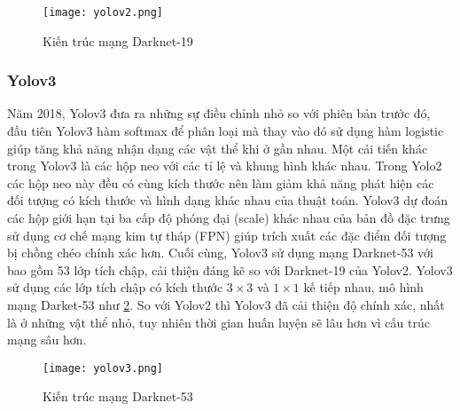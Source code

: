 \documentclass[../the.tex]{subfiles}
\begin{document}
\begin{figure}[H]
	\centering
	\texttt{[image: yolov2.png]}
	\caption{Kiến trúc mạng Darknet-19 \cite{deterseong}}
	\label{fig:yolov2}
\end{figure}
\bigskip

\subsubsection{Yolov3}
{\fontsize{13}{12} \selectfont  
Năm 2018, Yolov3 \cite{redmon2018yolov3} đưa ra những sự điều chỉnh nhỏ so với phiên bản trước đó, đầu tiên Yolov3 hàm softmax để phân loại mà thay vào đó sử dụng
hàm logistic giúp tăng khả năng nhận dạng các vật thể khi ở gần nhau. Một cải tiến khác trong Yolov3 là các hộp neo với các tỉ lệ và khung hình khác nhau. Trong Yolo2 các hộp neo này đều có cùng kích thước 
nên làm giảm khả năng phát hiện các đối tượng có kích thước và hình dạng khác nhau của thuật toán. Yolov3 dự đoán các hộp giới hạn tại ba cấp độ phóng đại (scale) khác nhau của bản đồ đặc trưng sử dụng cơ chế mạng kim tự tháp (FPN)  \cite{lin2017feature}
giúp trích xuất các đặc điểm đối tượng bị chồng chéo chính xác hơn. Cuối cùng, Yolov3 sử dụng mạng Darknet-53 với bao gồm 53 lớp tích chập, cải thiện đáng kẽ so với Darknet-19 của Yolov2.
Yolov3 sử dụng các lớp tích chập có kích thước $3 \times 3 $ và $1 \times 1$ kế tiếp nhau, mô hình mạng Darket-53 như \ref{fig:yolov3}. So với Yolov2 thì Yolov3 đã cải thiện độ chính xác, nhất là ở những vật thể nhỏ, tuy nhiên thời gian huấn luyện sẽ lâu hơn vì cấu trúc mạng sâu hơn.

}

\begin{figure}[H]
	\centering
	\texttt{[image: yolov3.png]}
	\caption{Kiến trúc mạng Darknet-53 \cite{detectiongao2021}}
	\label{fig:yolov3}
\end{figure}
\bigskip
\end{document}
